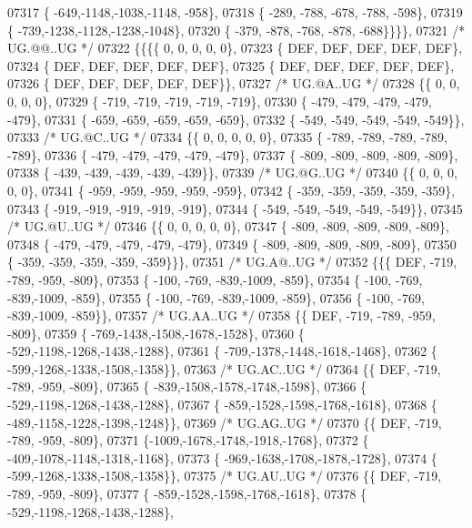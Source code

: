 \begin{DoxyCode}
07317 \{ -649,-1148,-1038,-1148, -958\},
07318 \{ -289, -788, -678, -788, -598\},
07319 \{ -739,-1238,-1128,-1238,-1048\},
07320 \{ -379, -878, -768, -878, -688\}\}\}\},
07321 \textcolor{comment}{/* UG.@@..UG */}
07322 \{\{\{\{    0,    0,    0,    0,    0\},
07323 \{  DEF,  DEF,  DEF,  DEF,  DEF\},
07324 \{  DEF,  DEF,  DEF,  DEF,  DEF\},
07325 \{  DEF,  DEF,  DEF,  DEF,  DEF\},
07326 \{  DEF,  DEF,  DEF,  DEF,  DEF\}\},
07327 \textcolor{comment}{/* UG.@A..UG */}
07328 \{\{    0,    0,    0,    0,    0\},
07329 \{ -719, -719, -719, -719, -719\},
07330 \{ -479, -479, -479, -479, -479\},
07331 \{ -659, -659, -659, -659, -659\},
07332 \{ -549, -549, -549, -549, -549\}\},
07333 \textcolor{comment}{/* UG.@C..UG */}
07334 \{\{    0,    0,    0,    0,    0\},
07335 \{ -789, -789, -789, -789, -789\},
07336 \{ -479, -479, -479, -479, -479\},
07337 \{ -809, -809, -809, -809, -809\},
07338 \{ -439, -439, -439, -439, -439\}\},
07339 \textcolor{comment}{/* UG.@G..UG */}
07340 \{\{    0,    0,    0,    0,    0\},
07341 \{ -959, -959, -959, -959, -959\},
07342 \{ -359, -359, -359, -359, -359\},
07343 \{ -919, -919, -919, -919, -919\},
07344 \{ -549, -549, -549, -549, -549\}\},
07345 \textcolor{comment}{/* UG.@U..UG */}
07346 \{\{    0,    0,    0,    0,    0\},
07347 \{ -809, -809, -809, -809, -809\},
07348 \{ -479, -479, -479, -479, -479\},
07349 \{ -809, -809, -809, -809, -809\},
07350 \{ -359, -359, -359, -359, -359\}\}\},
07351 \textcolor{comment}{/* UG.A@..UG */}
07352 \{\{\{  DEF, -719, -789, -959, -809\},
07353 \{ -100, -769, -839,-1009, -859\},
07354 \{ -100, -769, -839,-1009, -859\},
07355 \{ -100, -769, -839,-1009, -859\},
07356 \{ -100, -769, -839,-1009, -859\}\},
07357 \textcolor{comment}{/* UG.AA..UG */}
07358 \{\{  DEF, -719, -789, -959, -809\},
07359 \{ -769,-1438,-1508,-1678,-1528\},
07360 \{ -529,-1198,-1268,-1438,-1288\},
07361 \{ -709,-1378,-1448,-1618,-1468\},
07362 \{ -599,-1268,-1338,-1508,-1358\}\},
07363 \textcolor{comment}{/* UG.AC..UG */}
07364 \{\{  DEF, -719, -789, -959, -809\},
07365 \{ -839,-1508,-1578,-1748,-1598\},
07366 \{ -529,-1198,-1268,-1438,-1288\},
07367 \{ -859,-1528,-1598,-1768,-1618\},
07368 \{ -489,-1158,-1228,-1398,-1248\}\},
07369 \textcolor{comment}{/* UG.AG..UG */}
07370 \{\{  DEF, -719, -789, -959, -809\},
07371 \{-1009,-1678,-1748,-1918,-1768\},
07372 \{ -409,-1078,-1148,-1318,-1168\},
07373 \{ -969,-1638,-1708,-1878,-1728\},
07374 \{ -599,-1268,-1338,-1508,-1358\}\},
07375 \textcolor{comment}{/* UG.AU..UG */}
07376 \{\{  DEF, -719, -789, -959, -809\},
07377 \{ -859,-1528,-1598,-1768,-1618\},
07378 \{ -529,-1198,-1268,-1438,-1288\},

\end{DoxyCode}
